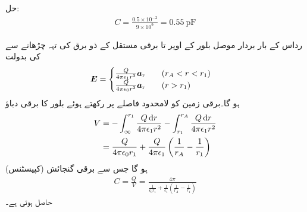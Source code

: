 حل: 
\begin{align*}
C=\frac{0.5 \times 10^{-2}}{9 \times 10^9}=\SI{0.55}{\pico \farad}
\end{align*}

 رداس کے بار بردار موصل بلور کے اوپر  تا  برقی مستقل  کے ذو برق کی تہہ چڑھانے سے  کی بدولت
\begin{align*}
{\ensuremath{{\boldsymbol{E}}}}=
\begin{cases}
\frac{Q}{4\pi\epsilon_1 r^2}{\boldsymbol{a}}_{\textup{r}}  \quad \quad (r_A < r < r_1) \\
\frac{Q}{4\pi\epsilon_0 r^2}{\boldsymbol{a}}_{\textup{r}} \quad \quad  (r >r_1)
\end{cases}
\end{align*}
ہو گا۔برقی زمین کو لامحدود فاصلے پر رکھتے ہوئے بلور کا برقی دباؤ
\begin{align*}
V&=-\int_{\infty}^{r_1}\frac{Q \dif r}{4\pi\epsilon_1 r^2} -\int_{r_1}^{r_A}\frac{Q \dif r}{4\pi\epsilon_1 r^2}\\
&=\frac{Q}{4\pi\epsilon_0 r_1} +\frac{Q}{4\pi\epsilon_1} \left(\frac{1}{r_A}-\frac{1}{r_1} \right)
\end{align*}
ہو گا جس سے برقی گنجائش (کپیسٹنس)
\begin{align}
C=\frac{Q}{V}=\frac{4\pi}{\frac{1}{\epsilon_0 r_1}+\frac{1}{\epsilon_1} \left(\frac{1}{r_A}-\frac{1}{r_1} \right)}
\end{align}
حاصل ہوتی ہے۔

